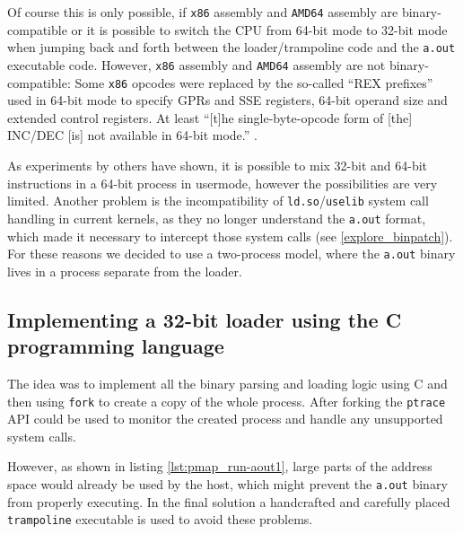 \documentclass[draft,final]{vutinfth} %
\begin{document}
Of course this is only possible, if \texttt{x86} assembly and \texttt{AMD64} assembly are binary-compatible or it is possible to switch the CPU from 64-bit mode to 32-bit mode when jumping back and forth between the loader/trampoline code and the \texttt{a.out} executable code. However, \texttt{x86} assembly and \texttt{AMD64} assembly are not binary-compatible: Some \texttt{x86} opcodes were replaced by the so-called ``REX prefixes'' used in 64-bit mode to specify GPRs and SSE registers, 64-bit operand size and extended control registers\cite[2.2.1]{IntelManualVol2A}.  At least ``[t]he single-byte-opcode form of [the] INC/DEC [is] not available in 64-bit mode.'' \cite[2.2.1.2, par. 2]{IntelManualVol2A}.

As experiments by others have shown\cite{SOMix32And64BitInstructions}, it is possible to mix 32-bit and 64-bit instructions in a 64-bit process in usermode, however the possibilities are very limited. Another problem is the incompatibility of \texttt{ld.so}/\texttt{uselib} system call handling in current kernels, as they no longer understand the \texttt{a.out} format, which made it necessary to intercept those system calls (see \ref{explore_binpatch}). For these reasons we decided to use a two-process model, where the \texttt{a.out} binary lives in a process separate from the loader.

\subsection{Implementing a 32-bit loader using the C programming language}
\label{explore_loader_using_C}

The idea was to implement all the binary parsing and loading logic using C and then using \texttt{fork} to create a copy of the whole process. After forking the \texttt{ptrace} API could be used to monitor the created process and handle any unsupported system calls.

However, as shown in listing \ref{lst:pmap_run-aout1}, large parts of the address space would already be used by the host, which might prevent the \texttt{a.out} binary from properly executing. In the final solution a handcrafted and carefully placed \texttt{trampoline} executable is used to avoid these problems.
\end{document}
